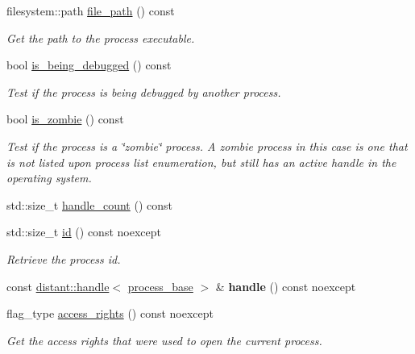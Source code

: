 \begin{DoxyCompactItemize}
filesystem\+::path \mbox{\hyperlink{classdistant_1_1kernel__objects_1_1process__base_a0c1640e125f4667c139bf9d44f7cd096}{file\+\_\+path}} () const
\begin{DoxyCompactList}\small\item\em Get the path to the process executable. \end{DoxyCompactList}\item 
bool \mbox{\hyperlink{classdistant_1_1kernel__objects_1_1process__base_a9acb308895639407b1925ad238f05344}{is\+\_\+being\+\_\+debugged}} () const
\begin{DoxyCompactList}\small\item\em Test if the process is being debugged by another process. \end{DoxyCompactList}\item 
bool \mbox{\hyperlink{classdistant_1_1kernel__objects_1_1process__base_ab023cd4a4d27ccef7879d1a3c513148b}{is\+\_\+zombie}} () const
\begin{DoxyCompactList}\small\item\em Test if the process is a \char`\"{}zombie\char`\"{} process. A zombie process in this case is one that is not listed upon process list enumeration, but still has an active handle in the operating system. \end{DoxyCompactList}\item 
std\+::size\+\_\+t \mbox{\hyperlink{classdistant_1_1kernel__objects_1_1process__base_a8c14c3aca084496eafa68f23b7535567}{handle\+\_\+count}} () const
\item 
std\+::size\+\_\+t \mbox{\hyperlink{classdistant_1_1kernel__objects_1_1process__base_a553b90767de864164d807075f67c1402}{id}} () const noexcept
\begin{DoxyCompactList}\small\item\em Retrieve the process id. \end{DoxyCompactList}\item 
\mbox{\label{classdistant_1_1kernel__objects_1_1process__base_a3476af5b30ce778a41eed891fdd93ece}} 
const \mbox{\hyperlink{classdistant_1_1handle}{distant\+::handle}}$<$ \mbox{\hyperlink{classdistant_1_1kernel__objects_1_1process__base}{process\+\_\+base}} $>$ \& {\bfseries handle} () const noexcept
\item 
flag\+\_\+type \mbox{\hyperlink{classdistant_1_1kernel__objects_1_1process__base_a28b2a7b7297714d4c7c4d320a0c4fbbc}{access\+\_\+rights}} () const noexcept
\begin{DoxyCompactList}\small\item\em Get the access rights that were used to open the current process. \end{DoxyCompactList}\item 

\end{DoxyCompactItemize}
